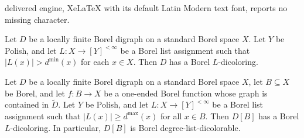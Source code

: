 \documentclass[10pt,a4paper]{amsart}
\begin{document}
delivered engine, XeLaTeX with its default Latin Modern text font, reports no missing character.
\begin{thm}
\label{thm:degplusone}
    Let $D$ be a locally finite Borel digraph on a standard Borel space $X$. Let $Y$ be Polish, and let $L : X \to [Y]^{< \infty}$ be a Borel list assignment such that $\vert L(x) \vert > d^{\min}(x)$ for each $x \in X$. Then $D$ has a Borel $L$-dicoloring.
\end{thm}

\begin{thm}
\label{thm:one ended implies dicoloring}
    Let $D$ be a locally finite Borel digraph on a standard Borel space $X$, let $B \subseteq X$ be Borel, and let $f : B \rightarrow X$ be a one-ended Borel function whose graph is contained in $\tilde{D}$. Let $Y$ be Polish, and let $L : X \rightarrow [Y]^{< \infty}$ be a Borel list assignment such that $\vert L(x) \vert \geq d^{\max}(x)$ for all $x \in B$. Then $D[B]$ has a Borel $L$-dicoloring. In particular, $D[B]$ is Borel degree-list-dicolorable.
\end{thm}
\end{document}
